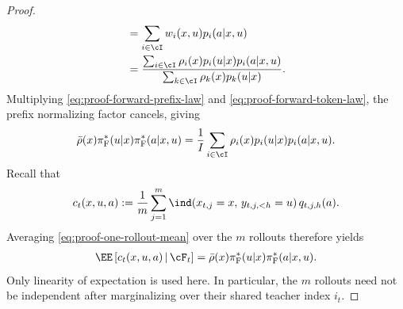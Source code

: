 \documentclass[11pt]{article}
\newcommand{\pif}{\pi_{\mathrm{F}}}
\begin{document}
\begin{proof}
\begin{align}
    &=
    \sum_{i\in\cI}
    w_i(x,u)p_i(a|x,u)
    \notag\\
    &=
    \frac{
        \sum_{i\in\cI}
        \rho_i(x)p_i(u|x)p_i(a|x,u)
    }{
        \sum_{k\in\cI}
        \rho_k(x)p_k(u|x)
    }.
    \label{eq:proof-forward-token-law}
\end{align}
Multiplying \eqref{eq:proof-forward-prefix-law} and
\eqref{eq:proof-forward-token-law}, the prefix normalizing factor cancels,
giving
\begin{align}
\notag
    \bar\rho(x)\pif^*(u|x)\pif^*(a|x,u)
    =
    \frac{1}{I}
    \sum_{i\in\cI}
    \rho_i(x)p_i(u|x)p_i(a|x,u).
\end{align}
Recall that
\begin{align*}
    c_t(x,u,a)
    :=
    \frac{1}{m}\sum_{j=1}^m
    \ind(x_{t,j}=x,\,y_{t,j,<h}=u)\,
    q_{t,j,h}(a).
\end{align*}
Averaging \eqref{eq:proof-one-rollout-mean} over the $m$ rollouts therefore
yields
\begin{align}
    \EE\left[
        c_t(x,u,a)
        \,\middle|\,
        \cF_t
    \right]
    =
    \bar\rho(x)
    \pif^*(u|x)
    \pif^*(a|x,u).
    \label{eq:proof-count-mean}
\end{align}
Only linearity of expectation is used here. In particular, the $m$ rollouts
need not be independent after marginalizing over their shared teacher index
$i_t$.


\end{proof}
\end{document}
